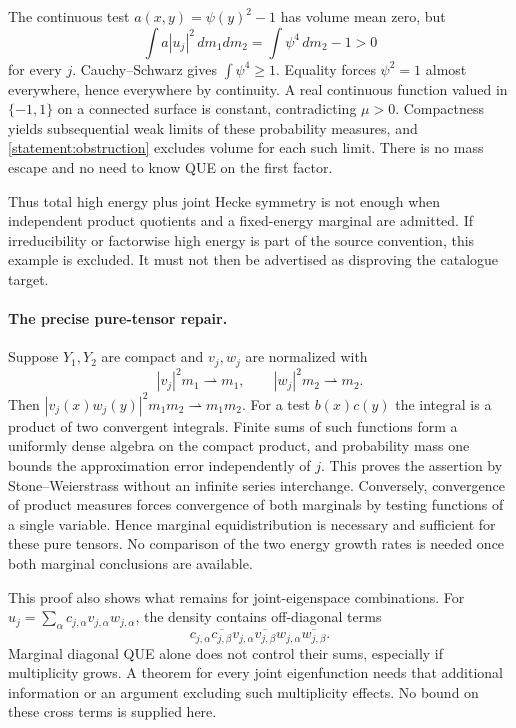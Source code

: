 \documentclass[11pt,a4paper]{article}
\numberwithin{equation}{section}
\begin{document}
The continuous test $a(x,y)=\psi(y)^2-1$ has volume mean zero, but
\begin{equation}\label{statement:obstruction}
 \int a|u_j|^2\,dm_1dm_2=\int\psi^4\,dm_2-1>0
\end{equation}
for every $j$. Cauchy--Schwarz gives $\int\psi^4\ge1$. Equality forces
$\psi^2=1$ almost everywhere, hence everywhere by continuity. A real
continuous function valued in $\{-1,1\}$ on a connected surface is constant,
contradicting $\mu>0$. Compactness yields subsequential weak limits of these
probability measures, and \eqref{statement:obstruction} excludes volume for each
such limit. There is no mass escape and no need to know QUE on the first
factor.

Thus total high energy plus joint Hecke symmetry is not enough when
independent product quotients and a fixed-energy marginal are admitted.
If irreducibility or factorwise high energy is part of the source convention,
this example is excluded. It must not then be advertised as disproving the
catalogue target.

\paragraph{The precise pure-tensor repair.}
Suppose $Y_1,Y_2$ are compact and $v_j,w_j$ are normalized with
\[
 |v_j|^2m_1\rightharpoonup m_1,\qquad
 |w_j|^2m_2\rightharpoonup m_2.
\]
Then $|v_j(x)w_j(y)|^2m_1m_2\rightharpoonup m_1m_2$. For a test
$b(x)c(y)$ the integral is a product of two convergent integrals. Finite sums
of such functions form a uniformly dense algebra on the compact product,
and probability mass one bounds the approximation error independently of
$j$. This proves the assertion by Stone--Weierstrass without an infinite
series interchange. Conversely, convergence of product measures forces
convergence of both marginals by testing functions of a single variable.
Hence marginal equidistribution is necessary and sufficient for these
pure tensors. No comparison of the two energy growth rates is needed once
both marginal conclusions are available.

This proof also shows what remains for joint-eigenspace combinations.
For $u_j=\sum_\alpha c_{j,\alpha}v_{j,\alpha}w_{j,\alpha}$, the density
contains off-diagonal terms
\[
 c_{j,\alpha}\overline{c_{j,\beta}}
 v_{j,\alpha}\overline{v_{j,\beta}}
 w_{j,\alpha}\overline{w_{j,\beta}}.
\]
Marginal diagonal QUE alone does not control their sums, especially if
multiplicity grows. A theorem for every joint eigenfunction needs that
additional information or an argument excluding such multiplicity effects.
No bound on these cross terms is supplied here.
\end{document}
